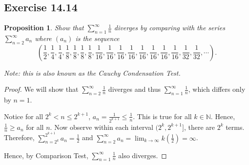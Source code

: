 \documentclass{article}
\newtheorem{proposition}[thm]{Proposition}
\begin{document}
\subsection*{Exercise 14.14}
\begin{proposition}
    Show that $\sum_{n=1}^{\infty}\frac{1}{n}$ diverges by comparing with the series 
    $\sum_{n=2}^{\infty}a_n$ where $(a_n)$ is the sequence 
    $$(\frac{1}{2},\frac{1}{4},\frac{1}{4},\frac{1}{8},\frac{1}{8},\frac{1}{8},\frac{1}{8}
    ,\frac{1}{16},\frac{1}{16},\frac{1}{16},\frac{1}{16},\frac{1}{16},\frac{1}{16},\frac{1}{16}
    ,\frac{1}{16},\frac{1}{32},\frac{1}{32}, \cdots).$$
    
    Note: this is also known as the Cauchy Condensation Test.
\end{proposition}
\begin{proof}
    We will show that $\sum_{n=2}^{\infty}\frac{1}{n}$ diverges and thus 
    $\sum_{n=1}^{\infty}\frac{1}{n}$, which differs only by $n=1$.

    Notice for all $2^k< n\le2^{k+1}$, $a_n = \frac{1}{2^{k+1}}\le\frac{1}{n}$. This is true for 
    all $k\in\mathbb{N}$. Hence, $\frac{1}{n}\ge a_n$ for all $n$. Now observe within each interval 
    $(2^k,2^{k+1}]$, there are $2^k$ terms. Therefore, $\sum_{n=2^k}^{2^{k+1}}a_n=\frac{1}{2}$ and 
    $\sum_{n=2}^{\infty}a_n = \lim_{k\to\infty}k\left(\frac{1}{2}\right)=\infty$. 

    Hence, by Comparison Test, $\sum_{n=1}^{\infty}\frac{1}{n}$ also diverges.
\end{proof}
\end{document}
